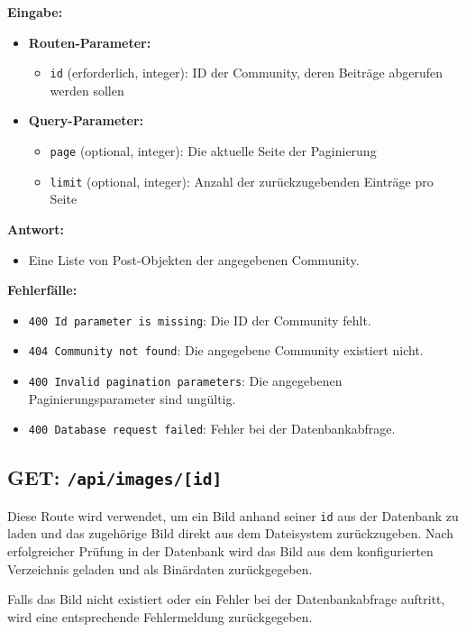 \documentclass[a4paper,12pt]{article}
\begin{document}
\textbf{Eingabe:}
\begin{itemize}
    \item \textbf{Routen-Parameter:}
    \begin{itemize}
        \item \texttt{id} (erforderlich, integer):
            ID der Community, deren Beiträge abgerufen werden sollen
    \end{itemize}
    \item \textbf{Query-Parameter:}
    \begin{itemize}
        \item \texttt{page} (optional, integer):
            Die aktuelle Seite der Paginierung
        \item \texttt{limit} (optional, integer):
            Anzahl der zurückzugebenden Einträge pro Seite
    \end{itemize}
\end{itemize}

\textbf{Antwort:}
\begin{itemize}
    \item Eine Liste von Post-Objekten der angegebenen Community.
\end{itemize}

\textbf{Fehlerfälle:}
\begin{itemize}
    \item \texttt{400 Id parameter is missing}:
        Die ID der Community fehlt.
    \item \texttt{404 Community not found}:
        Die angegebene Community existiert nicht.
    \item \texttt{400 Invalid pagination parameters}:
        Die angegebenen Paginierungsparameter sind ungültig.
    \item \texttt{400 Database request failed}:
        Fehler bei der Datenbankabfrage.
\end{itemize}

\newpage
\subsection{GET: \texttt{/api/images/[id]}}

Diese Route wird verwendet, um ein Bild anhand seiner \texttt{id} aus der
Datenbank zu laden und das zugehörige Bild direkt aus dem Dateisystem
zurückzugeben. Nach erfolgreicher Prüfung in der Datenbank wird das Bild aus
dem konfigurierten Verzeichnis geladen und als Binärdaten zurückgegeben.

Falls das Bild nicht existiert oder ein Fehler bei der Datenbankabfrage
auftritt, wird eine entsprechende Fehlermeldung zurückgegeben.
\end{document}
